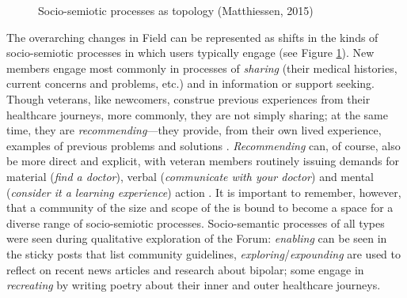\begin{figure}[htb]
\centering
{}
\caption[Socio-semiotic processes]{Socio-semiotic processes as topology (Matthiessen, 2015)}
\label{fig:pie-of-fortune}
\end{figure} 

The overarching changes in Field can be represented as shifts in the kinds of socio\hyp{}semiotic processes in which users typically engage (see Figure \ref{fig:pie-of-fortune}). New \glspl{member} engage most commonly in processes of \emph{sharing} (their medical histories, current concerns and problems, etc.) and in information or support seeking. Though veterans, like newcomers, construe previous experiences from their healthcare journeys, more commonly, they are not simply sharing; at the same time, they are \emph{recommending}---they provide, from their own lived experience, examples of previous problems and solutions \cite{koteyko2015performing}. \emph{Recommending} can, of course, also be more direct and explicit, with veteran \glspl{member} routinely issuing demands for material (\emph{find a doctor}), verbal (\emph{communicate with your doctor}) and mental (\emph{consider it a learning experience}) action \cite{pfeil_social_2011}. It is important to remember, however, that a community of the size and scope of the  is bound to become a space for a diverse range of socio\hyp{}semiotic processes. Socio\hyp{}semantic processes of all types were seen during qualitative exploration of the \gls{Forum}: \emph{enabling} can be seen in the sticky \glspl{post} that list community guidelines, \emph{exploring}\slash \emph{expounding} are used to reflect on recent news articles and research about \gls{bipolar}; some  engage in \emph{recreating} by writing poetry about their inner and outer healthcare journeys. 

